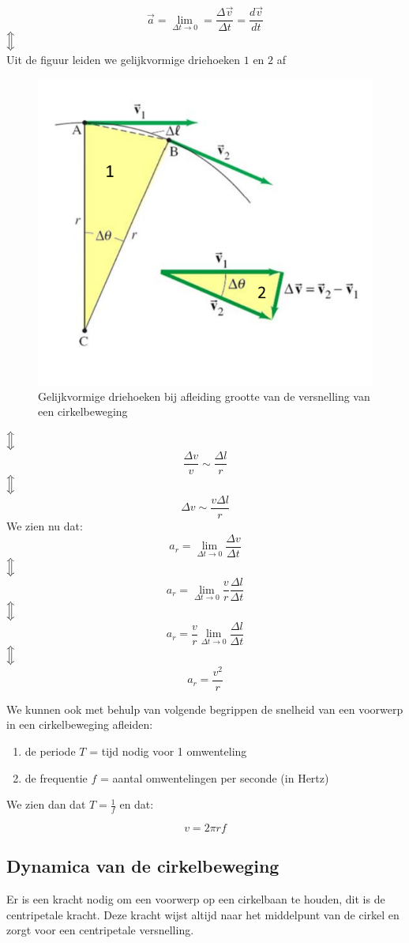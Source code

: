 \documentclass[12pt,a4paper]{article}
\newcommand{\Luda}{\Big\Updownarrow}
\begin{document}
    \begin{center}
    	\[\vec{a} = \lim_{\Delta t \to 0} = \frac{\Delta \vec{v}}{\Delta t} = \frac{d\vec{v}}{dt}\]
    	$\Luda$\\ Uit de figuur leiden we gelijkvormige driehoeken $1$ en $2$ af
	    	\begin{figure}[h]
	        		\centering
	       		 \includegraphics[width=0.6\linewidth]{cirkel}
	       		 \caption{Gelijkvormige driehoeken bij afleiding grootte van de versnelling van een cirkelbeweging}
	        		\label{cirkel}
	    	\end{figure}
	$\Luda$\[\frac{\Delta v}{v} \sim \frac{\Delta l}{r}\]
	$\Luda$\[\Delta v \sim \frac{v\Delta l}{r}\]	    	
	We zien nu dat:
	\[a_{r} = \lim_{\Delta t\to 0} \frac{\Delta v}{\Delta t}\]
	$\Luda$\[a_{r} = \lim_{\Delta t \to 0} \frac{v}{r}\frac{\Delta l}{\Delta t}\]
	$\Luda$\[a_{r} = \frac{v}{r} \lim_{\Delta t \to 0} \frac{\Delta l}{\Delta t}\]
	$\Luda$\[a_{r} = \frac{v^{2}}{r}\]
    \end{center}
    
    We kunnen ook met behulp van volgende begrippen de snelheid van een voorwerp in een cirkelbeweging afleiden:
    \begin{enumerate}
    	\item de periode $T$ = tijd nodig voor 1 omwenteling
    	\item de frequentie $f$ = aantal omwentelingen per seconde (in Hertz)
    \end{enumerate}
    
    We zien dan dat $T = \frac{1}{f}$ en dat:
    
    \begin{center}
    	\[v = 2\pi rf\]	
    \end{center}
    
    \subsection{Dynamica van de cirkelbeweging}
    Er is een kracht nodig om een voorwerp op een cirkelbaan te houden, dit is de centripetale kracht. Deze kracht wijst altijd naar het middelpunt
    van de cirkel en zorgt voor een centripetale versnelling. 
    
\end{document}
